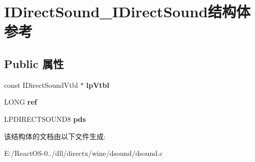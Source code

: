 \hypertarget{struct_i_direct_sound___i_direct_sound}{}\section{I\+Direct\+Sound\+\_\+\+I\+Direct\+Sound结构体 参考}
\label{struct_i_direct_sound___i_direct_sound}
\subsection*{Public 属性}
\begin{DoxyCompactItemize}
\item 
\mbox{\label{struct_i_direct_sound___i_direct_sound_a84edf7f0912f050972bbf5e125724344}} 
const I\+Direct\+Sound\+Vtbl $\ast$ {\bfseries lp\+Vtbl}
\item 
\mbox{\label{struct_i_direct_sound___i_direct_sound_ad9e1152afbd3c5e92dbd9bc3f065ad55}} 
L\+O\+NG {\bfseries ref}
\item 
\mbox{\label{struct_i_direct_sound___i_direct_sound_a10babff9bbbb173885b3a6fd3e2de014}} 
L\+P\+D\+I\+R\+E\+C\+T\+S\+O\+U\+N\+D8 {\bfseries pds}
\end{DoxyCompactItemize}


该结构体的文档由以下文件生成\+:\begin{DoxyCompactItemize}
\item 
E\+:/\+React\+O\+S-\/0../dll/directx/wine/dsound/dsound.\+c\end{DoxyCompactItemize}
